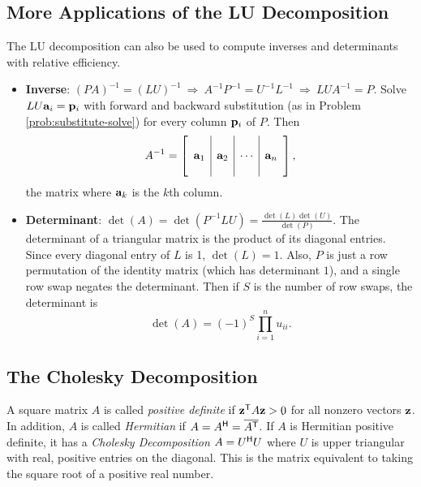 \subsection*{More Applications of the LU Decomposition} %

The LU decomposition can also be used to compute inverses and determinants with relative efficiency.

\begin{itemize}
\item \textbf{Inverse}:
$(PA)^{-1} = (LU)^{-1} \ \Longrightarrow\ A^{-1}P^{-1} = U^{-1}L^{-1} \ \Longrightarrow\ LUA^{-1} = P$.
Solve $LU\mathbf{a}_i = \mathbf{p}_i$ with forward and backward substitution (as in Problem \ref{prob:substitute-solve}) for every column $\mathbf{p}_i$ of $P$.
Then
\begin{align*}
A^{-1} =
\left[\begin{array}{c|c|c|c}
&&&\\
\mathbf{a}_1&\mathbf{a}_2&\cdots&\mathbf{a}_n
\\&&&
\end{array}\right],
\end{align*}
the matrix where $\mathbf{a}_k$ is the $k$th column.

\item \textbf{Determinant}: %
$\det(A) = \det(P^{-1}LU) = \frac{\det(L)\det(U)}{\det(P)}$.
The determinant of a triangular matrix is the product of its diagonal entries. Since every diagonal entry of $L$ is 1, $\det(L) = 1$.
Also, $P$ is just a row permutation of the identity matrix (which has determinant $1$), and a single row swap negates the determinant.
Then if $S$ is the number of row swaps, the determinant is
\[\det(A) = (-1)^S\prod_{i=1}^nu_{ii}.\]
\end{itemize}

\subsection*{The Cholesky Decomposition} %

A square matrix $A$ is called \emph{positive definite} if $\mathbf{z}^{\mathsf T} A\mathbf{z} > 0$ for all nonzero vectors $\mathbf{z}$.
In addition, $A$ is called \emph{Hermitian} if $A = A^{\mathsf H} = \overline{A^{\mathsf T}}$.
If $A$ is Hermitian positive definite, it has a \emph{Cholesky Decomposition} $A = U^{\mathsf H} U$ where $U$ is upper triangular with real, positive entries on the diagonal.
This is the matrix equivalent to taking the square root of a positive real number.

